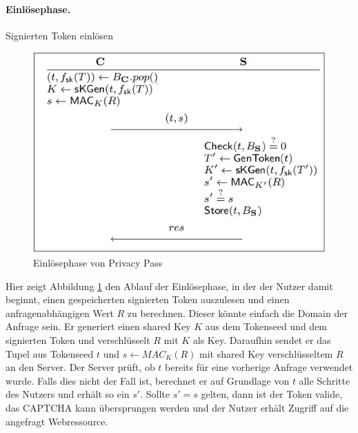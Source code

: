 \documentclass{scrreprt}
\begin{document}
\paragraph{Einlösephase.} Signierten Token einlösen\\
\begin{figure}[H]
    \centering
    \includegraphics[width=0.5\linewidth]{pp-redemptionphase.png} 
    \caption{Einlösephase von Privacy Pass \cite{pp-davidson2018privacy}}
    \label{fig:pp-redemptoinphase}
\end{figure}
Hier zeigt Abbildung \ref{fig:pp-redemptoinphase} den Ablauf der Einlösephase, in der der Nutzer damit beginnt, einen gespeicherten signierten Token auszulesen und einen anfragenabhängigen Wert $R$ zu berechnen. Dieser könnte einfach die Domain der Anfrage sein. Er generiert einen shared Key $K$ aus dem Tokenseed und dem signierten Token und verschlüsselt $R$ mit $K$ als Key. Daraufhin sendet er das Tupel aus Tokenseed $t$ und $s\leftarrow MAC_{K}(R)$ mit shared Key verschlüsseltem $R$ an den Server. Der Server prüft, ob $t$ bereits für eine vorherige Anfrage verwendet wurde. Falls dies nicht der Fall ist, berechnet er auf Grundlage von $t$ alle Schritte des Nutzers und erhält so ein $s'$. Sollte $s'=s$ gelten, dann ist der Token valide, das CAPTCHA kann übersprungen werden und der Nutzer erhält Zugriff auf die angefragt Webressource.
\end{document}
